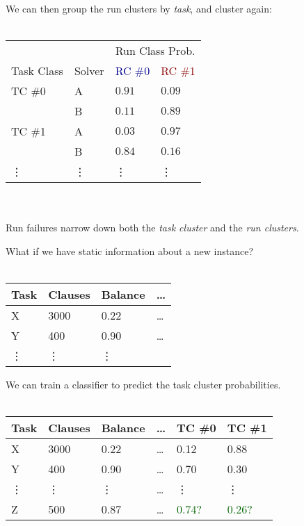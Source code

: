 \begin{frame}
We can then group the run clusters by \emph{task}, and cluster again:
\ \\
\ \\
\begin{center}
\begin{tabular}{llll}
\toprule
& & \multicolumn{2}{l}{Run Class Prob.}\\
\cmidrule{3-4}
Task Class & Solver & \textcolor{darkblue}{RC \#0} & \textcolor{darkred}{RC \#1}\\
\midrule
TC \#0 & A & $0.91$ & $0.09$\\
       & B & $0.11$ & $0.89$\\
TC \#1 & A & $0.03$ & $0.97$\\
       & B & $0.84$ & $0.16$\\
\vdots & \vdots & \vdots & \vdots\\
\bottomrule
\end{tabular}
\end{center}
\ \\
\ \\
Run failures narrow down both the \emph{task cluster} and the \emph{run clusters}.
\end{frame}

\begin{frame}
What if we have static information about a new instance?
\ \\
\ \\
\begin{center}
\begin{tabular}{llll}
\toprule
Task & Clauses & Balance & \dots\\
\midrule
X & 3000 & 0.22 & \dots\\
Y & 400 & 0.90 & \dots\\
\vdots & \vdots & \vdots &\\
\bottomrule
\end{tabular}
\end{center}
\end{frame}

\begin{frame}
We can train a classifier to predict the task cluster probabilities.
\ \\
\ \\
\begin{center}
\begin{tabular}{llllll}
\toprule
Task & Clauses & Balance & \dots & TC \#0 & TC \#1\\
\midrule
X & 3000 & 0.22 & \dots & 0.12 & 0.88\\
Y & 400 & 0.90 & \dots & 0.70 & 0.30\\
\vdots & \vdots & \vdots & \dots & \vdots & \vdots\\
Z & 500 & 0.87 & \dots & \textcolor{darkgreen}{0.74?} & \textcolor{darkgreen}{0.26?}\\
\bottomrule
\end{tabular}
\end{center}
\end{frame}

